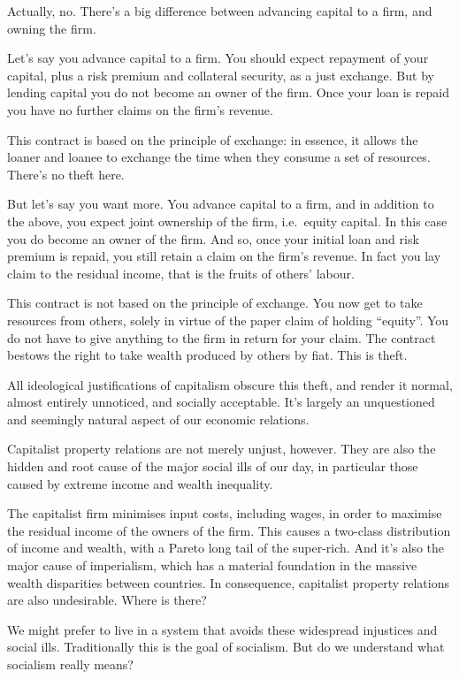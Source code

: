 \documentclass[
]{book}
\begin{document}
Actually, no. There's a big difference between advancing capital to a firm, and owning the firm.

Let's say you advance capital to a firm. You should expect repayment of your capital, plus a risk premium and collateral security, as a just exchange. But by lending capital you do not become an owner of the firm. Once your loan is repaid you have no further claims on the firm's revenue.

This contract is based on the principle of exchange: in essence, it allows the loaner and loanee to exchange the time when they consume a set of resources. There's no theft here.

But let's say you want more. You advance capital to a firm, and in addition to the above, you expect joint ownership of the firm, i.e.~equity capital. In this case you do become an owner of the firm. And so, once your initial loan and risk premium is repaid, you still retain a claim on the firm's revenue. In fact you lay claim to the residual income, that is the fruits of others' labour.

This contract is not based on the principle of exchange. You now get to take resources from others, solely in virtue of the paper claim of holding ``equity''. You do not have to give anything to the firm in return for your claim. The contract bestows the right to take wealth produced by others by fiat. This is theft.

All ideological justifications of capitalism obscure this theft, and render it normal, almost entirely unnoticed, and socially acceptable. It's largely an unquestioned and seemingly natural aspect of our economic relations.

Capitalist property relations are not merely unjust, however. They are also the hidden and root cause of the major social ills of our day, in particular those caused by extreme income and wealth inequality.

The capitalist firm minimises input costs, including wages, in order to maximise the residual income of the owners of the firm. This causes a two-class distribution of income and wealth, with a Pareto long tail of the super-rich. And it's also the major cause of imperialism, which has a material foundation in the massive wealth disparities between countries. In consequence, capitalist property relations are also undesirable.
Where is there?

We might prefer to live in a system that avoids these widespread injustices and social ills. Traditionally this is the goal of socialism. But do we understand what socialism really means?
\end{document}
